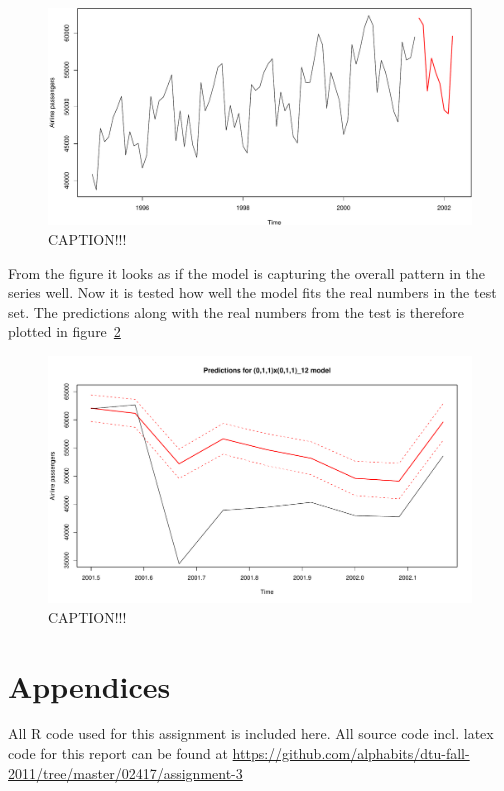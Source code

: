 \begin{figure}[ht]
    \centering
    \includegraphics[width=120mm]{../plots/training-and-prediction.pdf}
    \caption{CAPTION!!!}
    \label{fig:training-and-prediction}
\end{figure}

From the figure it looks as if the model is capturing the overall pattern in the series well. Now it is tested how well the model fits the real numbers in the test set. The predictions along with the real numbers from the test is therefore plotted in figure~\ref{fig:test-and-prediction}

\begin{figure}[ht]
    \centering
    \includegraphics[width=120mm]{../plots/test-and-prediction.pdf}
    \caption{CAPTION!!!}
    \label{fig:test-and-prediction}
\end{figure}

\pagebreak


\renewcommand\thesection{\Alph{section}}
\section{Appendices}

All R code used for this assignment is included here. All source code incl.
latex code for this report can be found at
{\small\url{https://github.com/alphabits/dtu-fall-2011/tree/master/02417/assignment-3}}

